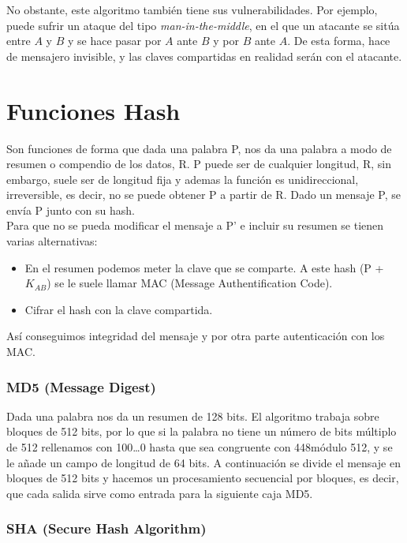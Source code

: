 No obstante, este algoritmo también tiene sus vulnerabilidades. Por ejemplo, puede sufrir un ataque del tipo \textit{man-in-the-middle}, en el que un atacante se sitúa entre $A$ y $B$ y se hace pasar por $A$ ante $B$ y por $B$ ante $A$. De esta forma, hace de mensajero invisible, y las claves compartidas en realidad serán con el atacante.

\section{Funciones Hash}

Son funciones de forma que dada una palabra P, nos da una palabra a modo de resumen o compendio de los datos, R. P puede ser de cualquier longitud, R, sin embargo, suele ser de longitud fija y ademas la función es unidireccional, irreversible, es decir, no se puede obtener P a partir de R. Dado un mensaje P, se envía P junto con su hash. \\

Para que no se pueda modificar el mensaje a P' e incluir su resumen se tienen varias alternativas: 
\begin{itemize}
    \item En el resumen podemos meter la clave que se comparte. A este hash (P + $K_{AB}$) se le suele llamar MAC (Message Authentification Code).
    \item Cifrar el hash con la clave compartida.
\end{itemize}

Así conseguimos integridad del mensaje y por otra parte autenticación con los MAC\@.

\subsubsection{MD5 (Message Digest)}

Dada una palabra nos da un resumen de 128 bits. El algoritmo trabaja sobre bloques de 512 bits, por lo que si la palabra no tiene un número de bits múltiplo de 512 rellenamos con 100\ldots0 hasta que sea congruente con 448módulo 512, y se le añade un campo de longitud de 64 bits. A continuación se divide el mensaje en bloques de 512 bits y hacemos un procesamiento secuencial por bloques, es decir, que cada salida sirve como entrada para la siguiente caja MD5\@.


\subsubsection{SHA (Secure Hash Algorithm)}

